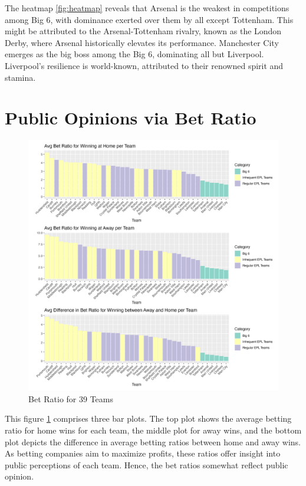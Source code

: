 \documentclass{article}
\begin{document}
The heatmap \ref{fig:heatmap} reveals that Arsenal is the weakest in competitions among Big 6, with dominance exerted over them by all except Tottenham. This might be attributed to the Arsenal-Tottenham rivalry, known as the London Derby, where Arsenal historically elevates its performance.
Manchester City emerges as the big boss among the Big 6, dominating all but Liverpool. Liverpool's resilience is world-known, attributed to their renowned spirit and stamina.

\section{Public Opinions via Bet Ratio}

\begin{figure}[h!]
\centering
\includegraphics[width=\textwidth]{BetRatio.png}
\caption{\label{fig:betratio}Bet Ratio for 39 Teams}
\end{figure}

This figure \ref{fig:betratio} comprises three bar plots. The top plot shows the average betting ratio for home wins for each team, the middle plot for away wins, and the bottom plot depicts the difference in average betting ratios between home and away wins. As betting companies aim to maximize profits, these ratios offer insight into public perceptions of each team. Hence, the bet ratios somewhat reflect public opinion.
\end{document}
